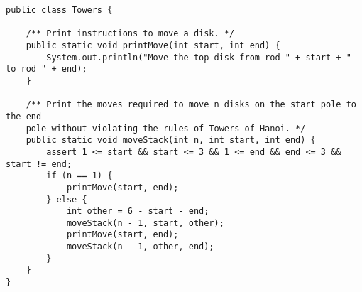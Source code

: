 \begin{solution}
\begin{lstlisting}
public class Towers {

    /** Print instructions to move a disk. */
    public static void printMove(int start, int end) {
        System.out.println("Move the top disk from rod " + start + " to rod " + end);
    }

    /** Print the moves required to move n disks on the start pole to the end
    pole without violating the rules of Towers of Hanoi. */
    public static void moveStack(int n, int start, int end) {
        assert 1 <= start && start <= 3 && 1 <= end && end <= 3 && start != end;
        if (n == 1) {
            printMove(start, end);
        } else {
            int other = 6 - start - end;
            moveStack(n - 1, start, other);
            printMove(start, end);
            moveStack(n - 1, other, end);
        }
    }
}
\end{lstlisting}
\end{solution}